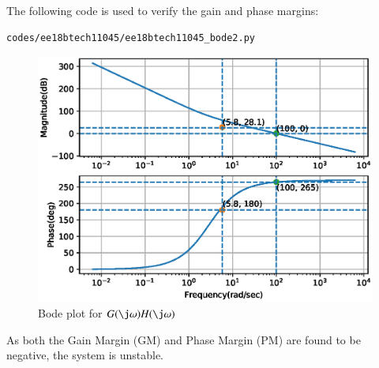 %

The following code is used to verify the gain and phase margins:
\begin{lstlisting}
codes/ee18btech11045/ee18btech11045_bode2.py
\end{lstlisting}

\begin{figure}[!ht]
\centering
\includegraphics[width=\columnwidth]{./figs/ee18btech11045/ee18btech11045_bode2.eps}
\caption{Bode plot for $G(\j\omega)H(\j\omega)$}
\label{fig:ee18btech11045_bode2}
\end{figure}


%

As both the Gain Margin (GM) and Phase Margin (PM) are found to be negative, the system is unstable.


